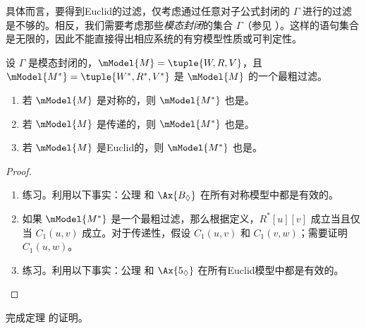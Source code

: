 \documentclass[../../../include/open-logic-section]{subfiles}
\begin{document}
具体而言，要得到Euclid的过滤，仅考虑通过任意对子公式封闭的 $\Gamma$ 进行的过滤是不够的。相反，我们需要考虑那些\emph{模态封闭}的集合 $\Gamma$（参见 ）。这样的语句集合是无限的，因此不能直接得出相应系统的有穷模型性质或可判定性。

\begin{thm}
  设 $\Gamma$ 是模态封闭的，$\mModel{M}=\tuple{W,R,V}$，且 $\mModel{M^*} = \tuple{W^*,R^*,V^*}$ 是 $\mModel{M}$ 的一个最粗过滤。
  \begin{enumerate}
  \item 若 $\mModel{M}$ 是对称的，则 $\mModel{M^*}$ 也是。
  \item 若 $\mModel{M}$ 是传递的，则 $\mModel{M^*}$ 也是。
  \item 若 $\mModel{M}$ 是Euclid的，则 $\mModel{M^*}$ 也是。
  \end{enumerate}
\end{thm}

\begin{proof}
\begin{enumerate}
  \item 练习。利用以下事实：公理  和 $\Ax{B_\Diamond}$ 在所有对称模型中都是有效的。
  \item 如果 $\mModel{M^*}$ 是一个最粗过滤，那么根据定义，$R^*[u][v]$ 成立当且仅当 $C_1(u,v)$ 成立。对于传递性，假设 $C_1(u,v)$ 和 $C_1(v,w)$；需要证明 $C_1(u,w)$。 
  \item 练习。利用以下事实：公理  和 $\Ax{5_\Diamond}$ 在所有Euclid模型中都是有效的。
\end{enumerate}
\end{proof}

\begin{prob}
  完成定理  的证明。
\end{prob}
\end{document}
